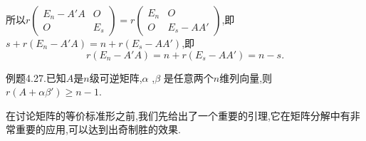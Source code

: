 \documentclass{article}
\begin{document}
所以$r \left(
    \begin{array}{cc}
            E_n - A'A & O   \\
            O         & E_s
        \end{array}
    \right)
    =
    r \left(
    \begin{array}{cc}
            E_n & O         \\
            O   & E_s - AA'
        \end{array}
    \right)$,即$s + r \left(E_n - A'A\right) = n + r \left(E_s - AA'\right)$,即
\begin{equation*}
    r \left(E_n - A'A\right) = n + r \left(E_s - AA'\right) = n - s.
\end{equation*}

{\heiti 例题4.27.}{\kaishu 已知$A$是$n$级可逆矩阵,$\alpha$ ,$\beta$ 是任意两个$n$维列向量,则$r \left(A + \alpha \beta '\right) \ge n - 1$.}

\vspace{2ex}

\vspace{1ex}
在讨论矩阵的等价标准形之前,我们先给出了一个重要的引理,它在矩阵分解中有非常重要的应用,可以达到出奇制胜的效果.
\end{document}
